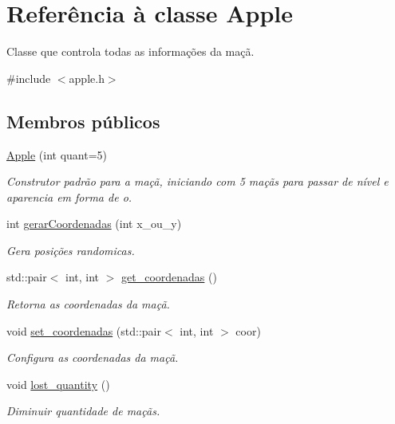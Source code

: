 \hypertarget{classApple}{}\section{Referência à classe Apple}
\label{classApple}


Classe que controla todas as informações da maçã.  




{\ttfamily \#include $<$apple.\+h$>$}

\subsection*{Membros públicos}
\begin{DoxyCompactItemize}
\item 
\hyperlink{classApple_a60951a54bc0a4d118798dc2be43f4e5e}{Apple} (int quant=5)
\begin{DoxyCompactList}\small\item\em Construtor padrão para a maçã, iniciando com 5 maçãs para passar de nível e aparencia em forma de o. \end{DoxyCompactList}\item 
int \hyperlink{classApple_a8251ad4f785ec75c8b26891a54ee9979}{gerar\+Coordenadas} (int x\+\_\+ou\+\_\+y)
\begin{DoxyCompactList}\small\item\em Gera posições randomicas. \end{DoxyCompactList}\item 
std\+::pair$<$ int, int $>$ \hyperlink{classApple_a84bbb1315d93e54972ff4b1a49b5b88a}{get\+\_\+coordenadas} ()
\begin{DoxyCompactList}\small\item\em Retorna as coordenadas da maçã. \end{DoxyCompactList}\item 
void \hyperlink{classApple_a591266baa919261a133e69eb1ab62a5a}{set\+\_\+coordenadas} (std\+::pair$<$ int, int $>$ coor)
\begin{DoxyCompactList}\small\item\em Configura as coordenadas da maçã. \end{DoxyCompactList}\item 
void \hyperlink{classApple_ac444e616a32d06b163cd3c4853845560}{lost\+\_\+quantity} ()
\begin{DoxyCompactList}\small\item\em Diminuir quantidade de maçãs. \end{DoxyCompactList}\item 

\end{DoxyCompactItemize}

